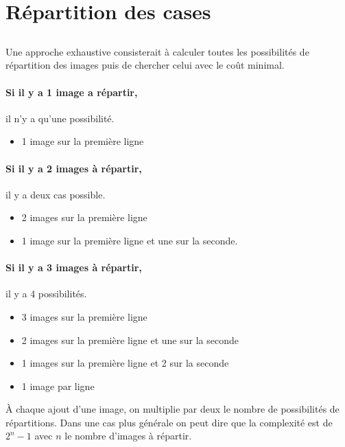
\usepackage{clrscode3e}





\section{Répartition des cases} %
\subsection{} %
Une approche exhaustive consisterait à calculer toutes les possibilités de répartition des images puis de chercher celui avec le coût minimal. \\

\paragraph{Si il y a 1 image a répartir,} il n'y a qu'une possibilité.
	\begin{itemize}
		\item 1 image sur la première ligne
	\end{itemize}
\paragraph{Si il y a 2 images à répartir,} il y a deux cas possible.
	\begin{itemize}
		\item 2 images sur la première ligne
		\item 1 image sur la première ligne et une sur la seconde.
	\end{itemize}

\paragraph{Si il y a 3 images à répartir,} il y a 4 possibilités.
	\begin{itemize}
		\item 3 images sur la première ligne
		\item 2 images sur la première ligne et une sur la seconde
		\item 1 images sur la première ligne et 2 sur la seconde
		\item 1 image par ligne\\
	\end{itemize}
	
À chaque ajout d'une image, on multiplie par deux le nombre de possibilités de répartitions. Dans une cas plus générale on peut dire que la complexité est de $2^n-1$ avec $n$ le nombre d'images à répartir.


